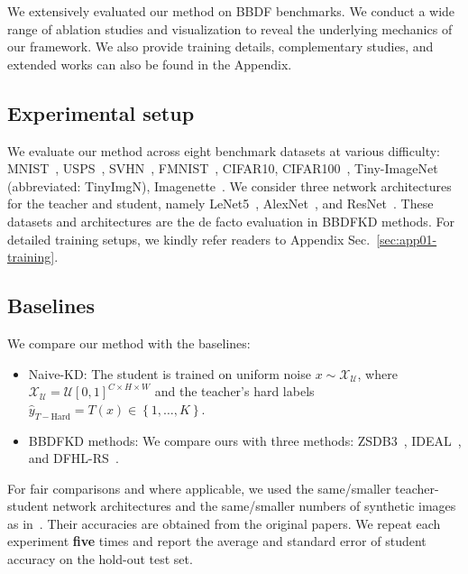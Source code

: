 \begin{foldable} %
    We extensively evaluated our method on BBDF benchmarks.
    We conduct a wide range of ablation studies and visualization to reveal the underlying mechanics of our framework.
    We also provide training details, complementary studies, and extended works can also be found in the Appendix.
\end{foldable}

\subsection{Experimental setup} \label{ssec:04-experiments-setup}
\begin{foldable} %
    We evaluate our method across eight benchmark datasets at various difficulty: MNIST~\cite{lecun2002gradient}, USPS~\cite{hull1994database}, SVHN~\cite{netzer2011reading}, FMNIST~\cite{xiao2017fashion}, CIFAR10, CIFAR100~\cite{krizhevsky2009learning}, Tiny-ImageNet~\cite{le2015tiny} (abbreviated: TinyImgN), Imagenette~\cite{howard2020imagenette}.
    We consider three network architectures for the teacher and student, namely LeNet5~\cite{lecun2002gradient}, AlexNet~\cite{krizhevsky2012imagenet}, and ResNet~\cite{he2016deep}.
    These datasets and architectures are the de facto evaluation in BBDFKD methods\cite{wang2021zero, zhang2022ideal, yuan2024data}.
    For detailed training setups, we kindly refer readers to Appendix Sec.~\ref{sec:app01-training}.
\end{foldable}


\subsection{Baselines} \label{ssec:04-experiments-baselines}
\begin{foldable} %
    We compare our method {\methodname} with the baselines:
    \begin{itemize}
        \item Naive-KD: The student is trained on uniform noise $x\sim\mathcal{X_{\mathcal{U}}}$, where $\mathcal{X}_{\mathcal{U}}=\mathcal{U}\left[0,1\right]^{C\times H\times W}$ and the teacher's hard labels $\hat{y}_{T-\text{Hard}}=T\left(x\right)\in\left\{ 1,\ldots,K\right\}$.
        \item BBDFKD methods: We compare ours with three methods: ZSDB3~\cite{wang2021zero}, IDEAL~\cite{zhang2022ideal}, and DFHL-RS~\cite{yuan2024data}.
    \end{itemize}
    For fair comparisons and where applicable, we used the same/smaller teacher-student network architectures and the same/smaller numbers of synthetic images as in~\cite{wang2021zero, zhang2022ideal, yuan2024data}.
    Their accuracies are obtained from the original papers.
    We repeat each experiment \textbf{five} times and report the average and standard error of student accuracy on the hold-out test set.
\end{foldable}


